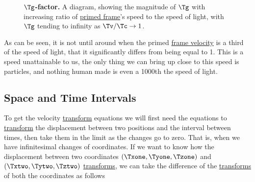 \begin{figure}[H]
	\centering
	\caption{$\boldsymbol{\Tg }$\textbf{-factor.} A diagram, showing the magnitude of $\Tg $ with increasing ratio of \protect\hyperlink{def-Primed-Frame}{primed frame}'s speed to the speed of light, with ${\Tg }$ tending to infinity as ${\Tv }/{\Tc }\rightarrow 1$.}
	\label{fig: Gamma Factor}
\end{figure}

As can be seen, it is not until around when the primed \hyperlink{def-frame-velocity}{frame velocity} is a third of the speed of light, that it significantly differs from being equal to 1.
This is a speed unattainable to us, the only thing we can bring up close to this speed is particles, and nothing human made is even a 1000th the speed of light.

\subsection{Space and Time Intervals} \label{subsect: Space and Time Intervals}

To get the velocity \hyperlink{def-transform}{transform} equations we will first need the equations to \hyperlink{def-transform}{transform} the displacement between two positions and the interval between times, then take them in the limit as the changes go to zero.
That is, when we have infinitesimal changes of coordinates.
If we want to know how the displacement between two coordinates $(\Txone ,\Tyone ,\Tzone )$ and $(\Txtwo ,\Tytwo ,\Tztwo )$ \hyperlink{def-transform}{transforms}, we can take the difference of the \hyperlink{def-transform}{transforms} of both the coordinates as follows

